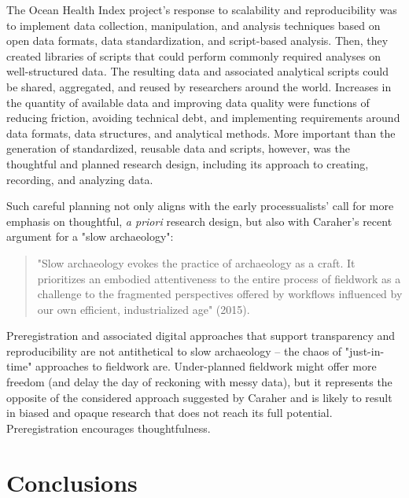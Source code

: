 \documentclass[article]{sa}
\begin{document}
The Ocean Health Index project's response to scalability and
reproducibility was to implement data collection, manipulation, and
analysis techniques based on open data formats, data standardization,
and script-based analysis. Then, they created libraries of scripts that
could perform commonly required analyses on well-structured data\emph{.}
The resulting data and associated analytical scripts could be shared,
aggregated, and reused by researchers around the world. Increases in the
quantity of available data and improving data quality were functions of
reducing friction, avoiding technical debt, and implementing
requirements around data formats, data structures, and analytical
methods. More important than the generation of standardized, reusable
data and scripts, however, was the thoughtful and planned research
design, including its approach to creating, recording, and analyzing
data.

Such careful planning not only aligns with the early processualists'
call for more emphasis on thoughtful, \emph{a priori} research design,
but also with Caraher's recent argument for a "slow archaeology":

\begin{quote}
    
"Slow archaeology evokes the practice of archaeology as a craft. It
prioritizes an embodied attentiveness to the entire process of fieldwork
as a challenge to the fragmented perspectives offered by workflows
influenced by our own efficient, industrialized age" (2015).

\end{quote}

Preregistration and associated digital approaches that support
transparency and reproducibility are not antithetical to slow
archaeology -- the chaos of "just-in-time" approaches to fieldwork
are. Under-planned fieldwork might offer more freedom (and delay the day
of reckoning with messy data), but it represents the opposite of the
considered approach suggested by Caraher and is likely to result in
biased and opaque research that does not reach its full potential.
Preregistration encourages thoughtfulness.

\section{Conclusions}
\end{document}
